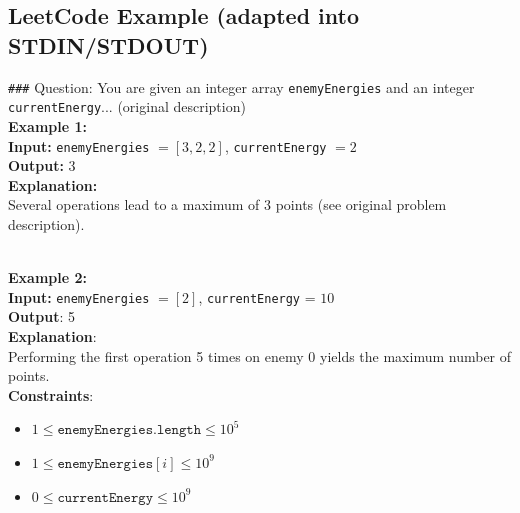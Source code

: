 \documentclass{llmxive}
\begin{document}
\subsection{LeetCode Example (adapted into STDIN/STDOUT)}
\label{app_leetcode_prompts}

\begin{origtext}
\texttt{\#\#\#} Question:  
You are given an integer array \texttt{enemyEnergies} and an integer \texttt{currentEnergy}... (original description)
\\

\textbf{Example 1:}  \\

\textbf{Input:} \texttt{enemyEnergies} $ = [3,2,2]$, \texttt{currentEnergy} $ = 2$  \\
\textbf{Output:} $3$  \\
\textbf{Explanation:}  \\
Several operations lead to a maximum of $3$ points (see original problem description).

\\

\textbf{Example 2:}  \\

\textbf{Input:} \texttt{enemyEnergies} $= [2]$, \texttt{currentEnergy} = $10$  \\
\textbf{Output}: 5  \\
\textbf{Explanation}:  \\
Performing the first operation 5 times on enemy 0 yields the maximum number of points. 
\\

\textbf{Constraints}:  
\begin{itemize}
    \item $1 \leq \texttt{enemyEnergies.length} \leq 10^5$
    \item $1 \leq \texttt{enemyEnergies}[i] \leq 10^9 $
    \item $0 \leq \texttt{currentEnergy} \leq 10^9$
\end{itemize}
\end{origtext}
\end{document}
